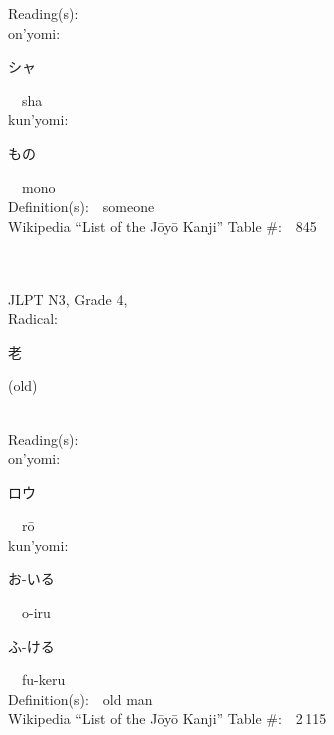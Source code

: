 \begin{multicols}{2}
Reading(s):\ \ \\
{\hspace*{1em}}on'yomi:\ \ \\
{\hspace*{2em}}{\begin{CJK}{UTF8}{min} シャ \end{CJK}}\ \ sha\ \ \\
{\hspace*{1em}}kun'yomi:\ \ \\
{\hspace*{2em}}{\begin{CJK}{UTF8}{min} もの \end{CJK}}\ \ mono\ \ \\
Definition(s):\ \ someone \\
Wikipedia ``List of the J\=oy\=o Kanji'' Table \#:\ \ 845 \\
\ \ \\
{\fontsize{34pt}{40pt}  }\ \ \\  %
{JLPT N3, Grade 4, \\Radical:\ \ {\begin{CJK}{UTF8}{min} 老 \end{CJK}} (old) } \\
Reading(s):\ \ \\
{\hspace*{1em}}on'yomi:\ \ \\
{\hspace*{2em}}{\begin{CJK}{UTF8}{min} ロウ \end{CJK}}\ \ r\=o\ \ \\
{\hspace*{1em}}kun'yomi:\ \ \\
{\hspace*{2em}}{\begin{CJK}{UTF8}{min} お-いる \end{CJK}}\ \ o-iru\ \ \\
{\hspace*{2em}}{\begin{CJK}{UTF8}{min} ふ-ける \end{CJK}}\ \ fu-keru\ \ \\
Definition(s):\ \ old man \\
Wikipedia ``List of the J\=oy\=o Kanji'' Table \#:\ \ 2\,115 \\
\ \ \\
\end{multicols}


